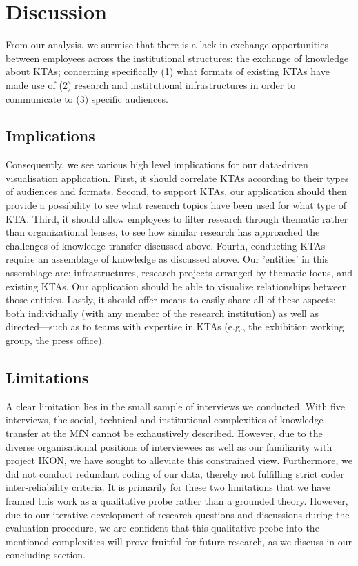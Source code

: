 \documentclass{article}
\begin{document}
\section{Discussion}
From our analysis, we surmise that there is a lack in exchange opportunities between employees across the institutional structures: the exchange of knowledge about KTAs; concerning specifically (1) what formats of existing KTAs have made use of (2) research and institutional infrastructures in order to communicate to (3) specific audiences. 

\subsection{Implications}
Consequently, we see various high level implications for our data-driven visualisation application. First, it should correlate KTAs according to their types of audiences and formats. Second, to support KTAs, our application should then provide a possibility to see what research topics have been used for what type of KTA. Third, it should allow employees to filter research through thematic rather than organizational lenses, to see how similar research has approached the challenges of knowledge transfer discussed above. Fourth, conducting KTAs require an assemblage of knowledge as discussed above. Our 'entities' in this assemblage are: infrastructures, research projects arranged by thematic focus, and existing KTAs. Our application should be able to visualize relationships between those entities. Lastly, it should offer means to easily share all of these aspects; both individually (with any member of the research institution) as well as directed—such as to teams with expertise in KTAs (e.g., the exhibition working group, the press office). 

\subsection{Limitations}
A clear limitation lies in the small sample of interviews we conducted. With five interviews, the social, technical and institutional complexities of knowledge transfer at the MfN cannot be exhaustively described. However, due to the diverse organisational positions of interviewees as well as our familiarity with project IKON, we have sought to alleviate this constrained view. Furthermore, we did not conduct redundant coding of our data, thereby not fulfilling strict coder inter-reliability criteria. It is primarily for these two limitations that we have framed this work as a qualitative probe rather than a grounded theory. However, due to our iterative development of research questions and discussions during the evaluation procedure, we are confident that this qualitative probe into the mentioned complexities will prove fruitful for future research, as we discuss in our concluding section.
\end{document}
